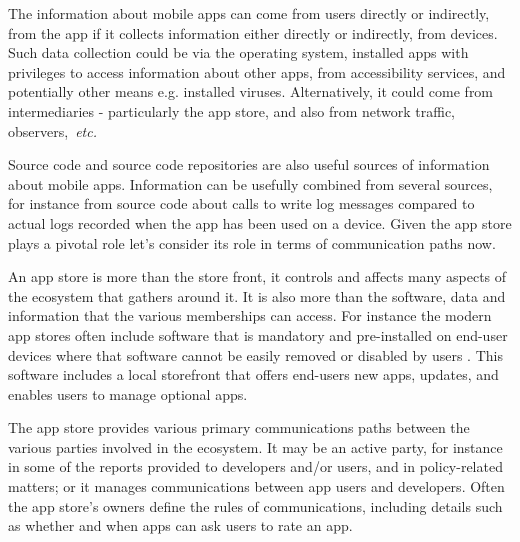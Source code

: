 The information about mobile apps can come from users directly or indirectly, from the app if it collects information either directly or indirectly, from devices. Such data collection could be via the operating system, installed apps with privileges to access information about other apps, from accessibility services, and potentially other means e.g. installed viruses. Alternatively, it could come from intermediaries - particularly the app store, and also from network traffic, observers,~\emph{etc.} 

Source code and source code repositories are also useful sources of information about mobile apps. Information can be usefully combined from several sources, for instance from source code about calls to write log messages compared to actual logs recorded when the app has been used on a device. Given the app store plays a pivotal role let's consider its role in terms of communication paths now. 

An app store is more than the store front, it controls and affects many aspects of the ecosystem that gathers around it. It is also more than the software, data and information that the various memberships can access. For instance the modern app stores often include software that is mandatory and pre-installed on end-user devices where that software cannot be easily removed or disabled by users . This software includes a local storefront that offers end-users new apps, updates, and enables users to manage optional apps.

The app store provides various primary communications paths between the various parties involved in the ecosystem. It may be an active party, for instance in some of the reports provided to developers and/or users, and in policy-related matters; or it manages communications between app users and developers. Often the app store's owners define the rules of communications, including details such as whether and when apps can ask users to rate an app.


